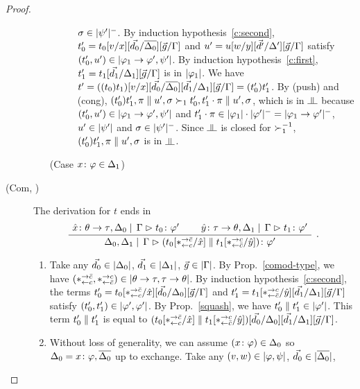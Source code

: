 \begin{proof}
\begin{description}
\begin{enumerate}[label=\textit{(\arabic{*})}]
\begin{description}
		             $\sigma\in|{\psi'}|^-$.
		    By induction hypothesis~\ref{c:second},
		    $t_0'=t_0[v/x][\vec{d_0}/\overline{\Delta_0}][\vec
		    g/\Gamma]$ and
		    $u' = u[w/y][\vec{d'}/\Delta'][\vec g/\Gamma]$ satisfy
		    $(t_0',u')\in|{\varphi_1\rightarrow\varphi',\psi'}|$.
		    By induction hypothesis~\ref{c:first},
		    $t_1'=t_1[\vec{d_1}/\Delta_1][\vec g/\Gamma]$ is in
		    $|{\varphi_1}|$.
		    We have $t' =
		    ((t_0)t_1)[v/x][\vec{d_0}/\overline{\Delta_0}][\vec{d_1}/\Delta_1][\vec
		    g/\Gamma] = (t_0')t_1'$.
		    By (push) and (cong), $(t_0')t_1',\pi\parallel
		    u',\sigma\succ_1 t_0',t_1'\cdot\pi\parallel u',\sigma$,
		    which is in $\bbot$ because
		    $(t_0',u')\in|{\varphi_1\rightarrow\varphi',\psi'}|$ and
		    $t_1'\cdot\pi\in |{\varphi_1}|\cdot|{\varphi'}|^- =
		    |{\varphi_1\rightarrow\varphi'}|^-$, $u'\in|{\psi'}|$
		    and $\sigma\in|{\psi'}|^-$.
		    Since $\bbot$ is closed for $\succ_1^{-1}$,
		    $(t_0')t_1',\pi\parallel u',\sigma$ is in $\bbot$.
	       \item[(Case ${x} \colon{\varphi}\in\Delta_1$)]
		    \fix{skipped}
	      \end{description}
       \end{enumerate}
  \item[(Com, \textminus)]
       The derivation for $t$ ends in
       \[
       \aseq{\tj{\hat x}{\theta\imp\tau},\D_0}{\G}{\tj{t_0}{\phi'}}
       \aseq{\tj{\hat y}{\tau\imp\theta},\D_1}{\G}{\tj{t_1}{\phi'}}
       \bseq{\D_0,\D_1}\G{\tj{(t_0[\comodL/\hat x]\conc t_1[\comodR/\hat
       y])}{\phi'}}
       \DisplayProof\enspace.
       \]
       \begin{enumerate}[label=\textit{(\arabic{*})}]
	\item Take any
	      $\vec{d_0}\in|{\Delta_0}|$,
	      $\vec{d_1}\in|{\Delta_1}|$,
	      $\vec{g}  \in|{\Gamma}|$.
	      By Prop.~\ref{comod-type}, we have
	      $(\ast^{\rightarrow {\bar{c}}}_{\leftarrow{c}},\ast^{\rightarrow {c}}_{\leftarrow{\bar{c}}})\in|{\theta\rightarrow\tau,\tau\rightarrow\theta}|$.
	      By induction hypothesis~\ref{c:second}, the terms
	      $t_0'=t_0[\ast^{\rightarrow {\bar{c}}}_{\leftarrow{c}}/\hat x][\vec{d_0}/\Delta_0][\vec g/\Gamma]$
	      and
	      $t_1'=t_1[\ast^{\rightarrow {c}}_{\leftarrow{\bar{c}}}/\hat y][\vec{d_1}/\Delta_1][\vec g/\Gamma]$
	      satisfy
	      $(t_0',t_1')\in|{\varphi',\varphi'}|$.
	      By Prop.~\ref{squash}, we have $t_0'\parallel
	      t_1'\in|{\varphi'}|$.
	      This term $t_0'\parallel t_1'$ is equal to
	      $(t_0[\ast^{\rightarrow {\bar{c}}}_{\leftarrow{c}}/\hat x]\parallel t_1[\ast^{\rightarrow {c}}_{\leftarrow{\bar{c}}}/\hat
	      y])[\vec{d_0}/\Delta_0][\vec{d_1}/\Delta_1][\vec g/\Gamma]$.
	\item Without loss of generality,
	      we can assume $({x} \colon{\varphi})\in\Delta_0$ so
	      $\Delta_0 ={x} \colon{\varphi}, \overline{\Delta_0}$ up to exchange.
	      Take any
	      $(v,w)\in|{\varphi,\psi}|$,
	      $\vec{d_0}\in|{\overline{\Delta_0}}|$,

\end{enumerate}
\end{description}
\end{proof}
